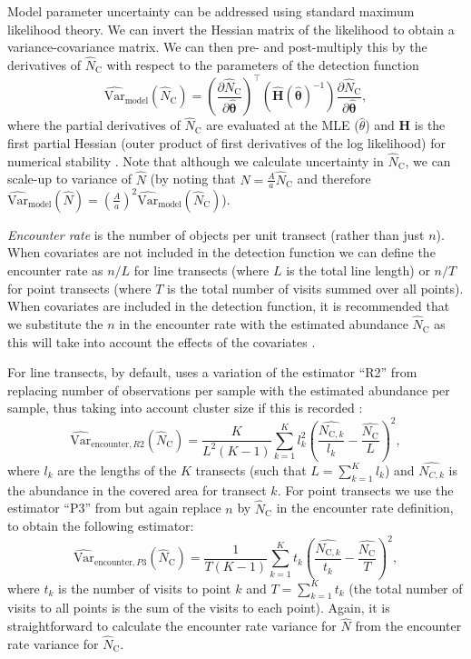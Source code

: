 \documentclass[article]{jss}\usepackage[]{graphicx}\usepackage[]{color}
\begin{document}
Model parameter uncertainty can be addressed using standard maximum likelihood theory. We can invert the Hessian matrix of the likelihood to obtain a variance-covariance matrix. We can then pre- and post-multiply this by the derivatives of $\hat{N}_\text{C}$ with respect to the parameters of the detection function
$$
\widehat{\text{Var}}_\text{model}\left( \hat{N}_\text{C}\right) = \left(\frac{\partial \hat{N}_\text{C}}{\partial\hat{\boldsymbol{\theta}}}\right)^\top \left(\hat{\mathbf{H}}(\hat{\boldsymbol{\theta}})^{-1} \right)\frac{\partial \hat{N}_\text{C}}{\partial\hat{\boldsymbol{\theta}}},
$$
where the partial derivatives of $\hat{N}_\text{C}$ are evaluated at the MLE ($\hat{\theta}$) and $\mathbf{H}$ is the first partial Hessian (outer product of first derivatives of the log likelihood) for numerical stability \citep[][p 62]{Buckland:2001vm}. Note that although we calculate uncertainty in $\hat{N}_\text{C}$, we can scale-up to variance of $\hat{N}$ (by noting that $\hat{N} = \frac{A}{a} \hat{N}_\text{C}$ and therefore $\widehat{\text{Var}}_\text{model}\left(\hat{N}\right) = \left( \frac{A}{a} \right)^2 \widehat{\text{Var}}_\text{model} \left(\hat{N}_\text{C} \right)$).

\textit{Encounter rate} is the number of objects per unit transect (rather than just $n$). When covariates are not included in the detection function we can define the encounter rate as $n/L$ for line transects (where $L$ is the total line length) or $n/T$ for point transects (where $T$ is the total number of visits summed over all points). When covariates are included in the detection function, it is recommended that we substitute the $n$ in the encounter rate with the estimated abundance $\hat{N}_\text{C}$ as this will take into account the effects of the covariates \citep{Innes:2002ka}.

For line transects, by default,  uses a variation of the estimator ``R2'' from \cite{Fewster:2009ku} replacing number of observations per sample with the estimated abundance per sample, thus taking into account cluster size if this is recorded \citep{Innes:2002ka, Marques:2003vb}:
$$
\widehat{\text{Var}}_{\text{encounter},R2}\left( \hat{N}_\text{C}\right) = \frac{K}{L^2(K-1)} \sum_{k=1}^{K} l_k^2 \left( \frac{\hat{N_{\text{C}, k}}}{l_k} - \frac{\hat{N_\text{C}}}{L}\right)^2,
$$
where $l_k$ are the lengths of the $K$ transects (such that $L = \sum_{k=1}^K l_k$) and $\hat{N_{C,k}}$ is the abundance in the covered area for transect $k$. For point transects we use the estimator ``P3'' from \cite{Fewster:2009ku} but again replace $n$ by $\hat{N}_\text{C}$ in the encounter rate definition, to obtain the following estimator:
$$
\widehat{\text{Var}}_{\text{encounter},P3}\left( \hat{N}_\text{C}\right) = \frac{1}{T(K-1)} \sum_{k=1}^{K} t_k \left( \frac{\hat{N_{\text{C}, k}}}{t_k} - \frac{\hat{N_\text{C}}}{T}\right)^2,
$$
where $t_k$ is the number of visits to point $k$ and $T = \sum_{k=1}^K t_k$ (the total number of visits to all points is the sum of the visits to each point). Again, it is straightforward to calculate the encounter rate variance for $\hat{N}$ from the encounter rate variance for $\hat{N}_\text{C}$.
\end{document}
